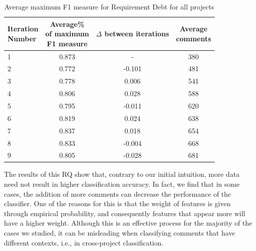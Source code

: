 \begin{table}[!thb]
	\begin{center}
		\caption{Average maximum F1 measure for Requirement Debt for all projects}
		\label{tbl:requirement_iteration_performance}
		\begin{tabular}{l| c c c}
			\toprule
			\thead{Iteration\\Number} & \thead{Average\%\\of maximum\\F1 measure} & \thead{$\Delta$\\between\\iterations} & \thead{Average\\comments} \\
			\midrule
			1  &  0.873 &   -      &  380 \\  
      2  &  0.772 & -0.101   &  481 \\
      3  &  0.778 & 0.006    &  541 \\  
      4  &  0.806 & 0.028    &  588 \\
      5  &  0.795 & -0.011   &  620  \\
      6  &  0.819 & 0.024    &  638  \\
			7  &  0.837 & 0.018    &  654  \\  
      8  &  0.833 & -0.004   &  668  \\  
      9  &  0.805 & -0.028   &  681  \\  
			\bottomrule
		\end{tabular}
	\end{center}    
\end{table}


The results of this RQ show that, contrary to our initial intuition, more data need not result in higher classification accuracy. In fact, we find that in some cases, the addition of more comments can decrease the performance of the classifier. One of the reasons for this is that the weight of features is given through empirical probability, and consequently features that appear more will have a higher weight. Although this is an effective process for the majority of the cases we studied, it can be misleading when classifying comments that have different contexts, i.e., in cross-project classification.

